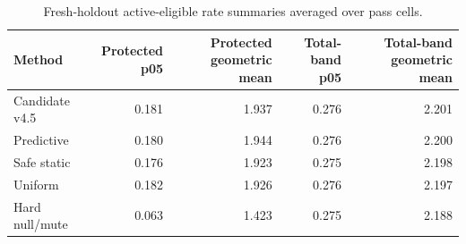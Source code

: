 \begin{table}[t]
\caption{Fresh-holdout active-eligible rate summaries averaged over pass cells.}
\label{tab:rate-summary}
\centering
\footnotesize
\setlength{\tabcolsep}{5.0pt}
\renewcommand{\arraystretch}{1.08}
\begin{tabular}{@{}lrrrr@{}}
\toprule
Method & Protected p05 & Protected geometric mean & Total-band p05 & Total-band geometric mean\\
\midrule
Candidate v4.5 & 0.181 & 1.937 & 0.276 & 2.201\\
Predictive & 0.180 & 1.944 & 0.276 & 2.200\\
Safe static & 0.176 & 1.923 & 0.275 & 2.198\\
Uniform & 0.182 & 1.926 & 0.276 & 2.197\\
Hard null/mute & 0.063 & 1.423 & 0.275 & 2.188\\
\bottomrule
\end{tabular}
\end{table}
